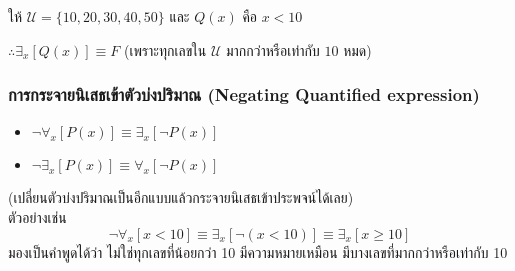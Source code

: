 \documentclass[12pt,a4paper]{article}
\begin{document}
ให้ $\mathcal{U} = \{10,20,30,40,50\}$ และ $Q(x)$ คือ $x < 10$\\
\rule{0pt}{4ex}
$\therefore \exists_x[Q(x)] \equiv F$ (เพราะทุกเลขใน $\mathcal{U}$ มากกว่าหรือเท่ากับ $10$ หมด)

\subsubsection*{การกระจายนิเสธเข้าตัวบ่งปริมาณ (Negating Quantified expression)}
\begin{itemize}
    \item $\neg\forall_x[P(x)] \equiv \exists_x[\neg P(x)]$
    \item $\neg\exists_x[P(x)] \equiv \forall_x[\neg P(x)]$
\end{itemize}
(เปลี่ยนตัวบ่งปริมาณเป็นอีกแบบแล้วกระจายนิเสธเข้าประพจน์ได้เลย) \\
ตัวอย่างเช่น \\
$$
    \neg \forall_x[x < 10] \equiv \exists_x[\neg( x < 10)] \equiv \exists_x[x \ge 10]
$$
มองเป็นคำพูดได้ว่า ไม่ใช่ทุกเลขที่น้อยกว่า 10 มีความหมายเหมือน มีบางเลขที่มากกว่าหรือเท่ากับ 10
\end{document}

